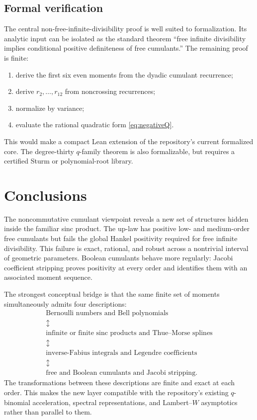 \documentclass[11pt,oneside]{article}
\theoremstyle{definition}
\theoremstyle{remark}
\begin{document}
\subsection{Formal verification}
The central non-free-infinite-divisibility proof is well suited to formalization. Its analytic input can be isolated as the standard theorem ``free infinite divisibility implies conditional positive definiteness of free cumulants.'' The remaining proof is finite:
\begin{enumerate}[label=(\arabic*)]
\item derive the first six even moments from the dyadic cumulant recurrence;
\item derive \(r_2,\ldots,r_{12}\) from noncrossing recurrences;
\item normalize by variance;
\item evaluate the rational quadratic form \eqref{eq:negativeQ}.
\end{enumerate}
This would make a compact Lean extension of the repository's current formalized core. The degree-thirty \(q\)-family theorem is also formalizable, but requires a certified Sturm or polynomial-root library.

\section{Conclusions}
The noncommutative cumulant viewpoint reveals a new set of structures hidden inside the familiar sinc product. The up-law has positive low- and medium-order free cumulants but fails the global Hankel positivity required for free infinite divisibility. This failure is exact, rational, and robust across a nontrivial interval of geometric parameters. Boolean cumulants behave more regularly: Jacobi coefficient stripping proves positivity at every order and identifies them with an associated moment sequence.

The strongest conceptual bridge is that the same finite set of moments simultaneously admits four descriptions:
\[
\begin{array}{c}
\text{Bernoulli numbers and Bell polynomials}\\
\updownarrow\\
\text{infinite or finite sinc products and Thue--Morse splines}\\
\updownarrow\\
\text{inverse-Fabius integrals and Legendre coefficients}\\
\updownarrow\\
\text{free and Boolean cumulants and Jacobi stripping}.
\end{array}
\]
The transformations between these descriptions are finite and exact at each order. This makes the new layer compatible with the repository's existing \(q\)-binomial acceleration, spectral representations, and Lambert--\(W\) asymptotics rather than parallel to them.
\end{document}
